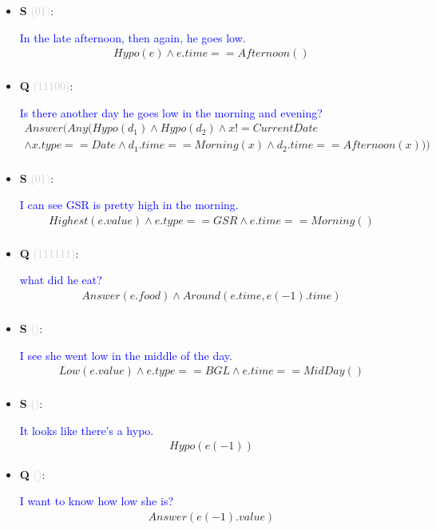 \documentclass[11pt]{article}
\newcounter{CQ}
\newcounter{CS}
\newcommand{\key}[1]{\textcolor{lightgray}{#1}}
\begin{document}
\begin{itemize}
	
	\item
	\textbf{S\theCS} \key{(01)}: \addtocounter{CS}{1}
	\textcolor{blue}{ In the late afternoon, then again, he goes low.}
	\begin{multline*}
	Hypo(e) \wedge e.time==Afternoon() \\
	\end{multline*}
	
	
	\item
	\textbf{Q\theCQ} \key{(11100)}: \addtocounter{CQ}{1}
	\textcolor{blue}{ Is there another day he goes low in the morning and evening? }
	\begin{multline*}
	Answer( Any(Hypo(d_1) \wedge Hypo(d_2) \wedge x != CurrentDate \\
	\wedge x.type==Date \wedge d_1.time==Morning(x) \wedge d_2.time==Afternoon(x)) ) \\
	\end{multline*}
	
	
	\item
	\textbf{S\theCS} \key{(01)}: \addtocounter{CS}{1}
	\textcolor{blue}{ I can see GSR is pretty high in the morning. }
	\begin{multline*}
	Highest(e.value) \wedge e.type==GSR \wedge e.time==Morning()\\
	\end{multline*}
	
	
	\item
	\textbf{Q\theCQ} \key{(111111)}: \addtocounter{CQ}{1}
	\textcolor{blue}{ what did he eat? }
	\begin{multline*}
	Answer(e.food) \wedge Around(e.time, e(-1).time) \\
	\end{multline*}


	\item
	\textbf{S\theCS} \key{()}: \addtocounter{CS}{1}
	\textcolor{blue}{ I see she went low in the middle of the day. }
	\begin{multline*}
	Low(e.value) \wedge e.type==BGL \wedge e.time==MidDay() \\
	\end{multline*} 
    
	\item
	\textbf{S\theCS} \key{()}: \addtocounter{CS}{1}
	\textcolor{blue}{ It looks like there's a hypo. }
	\begin{multline*}  
    Hypo(e(-1))
	\end{multline*} 
    
    
    \item
    \textbf{Q\theCQ} \key{()}: \addtocounter{CQ}{1}
    \textcolor{blue}{ I want to know how low she is? }
    \begin{multline*}
    Answer(e(-1).value) \\
    \end{multline*}
	

\end{itemize}
\end{document}
